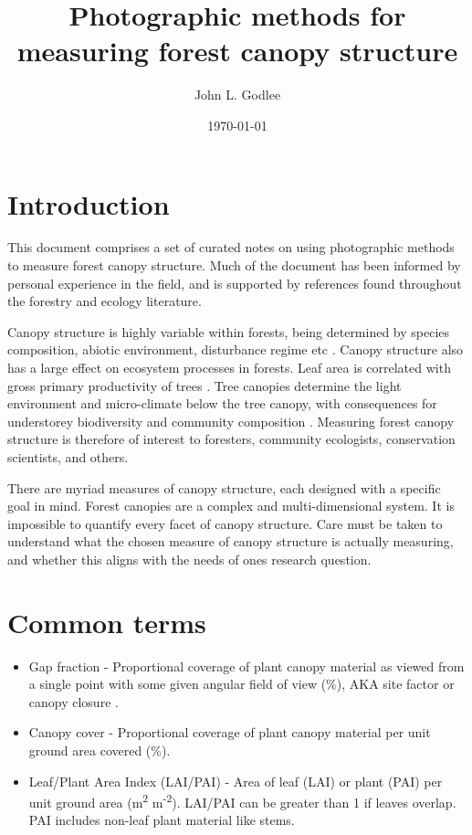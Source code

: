 \documentclass[11pt,a4paper]{article}
\title{Photographic methods for measuring forest canopy structure}
\date{\today}
\author{John L. Godlee}
\begin{document}
\maketitle

\tableofcontents
\newpage

\section{Introduction}

This document comprises a set of curated notes on using photographic methods to measure forest canopy structure. Much of the document has been informed by personal experience in the field, and is supported by references found throughout the forestry and ecology literature. 

Canopy structure is highly variable within forests, being determined by species composition, abiotic environment, disturbance regime etc \citep{Fotis2018}. Canopy structure also has a large effect on ecosystem processes in forests. Leaf area is correlated with gross primary productivity of trees \citep{Chen2012}. Tree canopies determine the light environment and micro-climate below the tree canopy, with consequences for understorey biodiversity and community composition \citep{Bartels2010, Barbier2008}. Measuring forest canopy structure is therefore of interest to foresters, community ecologists, conservation scientists, and others.

There are myriad measures of canopy structure, each designed with a specific goal in mind. Forest canopies are a complex and multi-dimensional system. It is impossible to quantify every facet of canopy structure. Care must be taken to understand what the chosen measure of canopy structure is actually measuring, and whether this aligns with the needs of ones research question.

\section{Common terms}

\begin{itemize}
	\item{Gap fraction - Proportional coverage of plant canopy material as viewed from a single point with some given angular field of view (\%), AKA site factor or canopy closure \citep{Anderson1964}.}
	\item{Canopy cover - Proportional coverage of plant canopy material per unit ground area covered (\%).}
	\item{Leaf/Plant Area Index (LAI/PAI) - Area of leaf (LAI) or plant (PAI) per unit ground area (m\textsuperscript{2} m\textsuperscript{-2}). LAI/PAI can be greater than 1 if leaves overlap. PAI includes non-leaf plant material like stems.}
\end{itemize}
\end{document}
